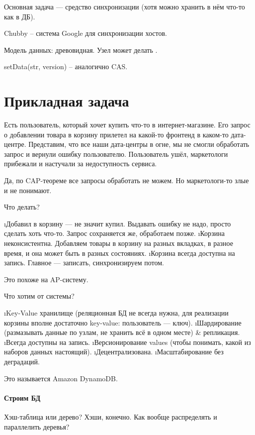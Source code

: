 Основная задача --- средство синхронизации (хотя можно хранить в нём что-то как в ДБ).

Chubby -- система Google для синхронизации хостов. 

Модель данных: древовидная.
Узел может делать .

setData(str, version) -- аналогично CAS.

\section{Прикладная задача}
Есть пользователь, который хочет купить что-то в интернет-магазине. Его запрос о добавлении товара в корзину прилетел на какой-то фронтенд в каком-то дата-центре. Представим, что все наши дата-центры в огне, мы не смогли обработать запрос и вернули ошибку пользователю. Пользователь ушёл, маркетологи прибежали и настучали за недоступность сервиса. 

Да, по CAP-теореме все запросы обработать не можем. Но маркетологи-то злые и не понимают.

Что делать?
\begin{enumerate}
\i Добавил в корзину --- не значит купил. Выдавать ошибку не надо, просто сделать хоть что-то. Запрос сохраняется же, обработаем позже.
\i Корзина неконсистентна. Добавляем товары в корзину на разных вкладках, в разное время, и она может быть в разных состояниях.
\i Корзина всегда доступна на запись. Главное --- записать, синхронизируем потом.
\end{enumerate}
Это похоже на AP-систему.

Что хотим от системы?
\begin{enumerate}
\i Key-Value хранилище (реляционная БД не всегда нужна, для реализации корзины вполне достаточно key-value: пользователь --- ключ).
\i Шардирование (размазывать данные по узлам, не хранить всё в одном месте) \& репликация.
\i Всегда доступны на запись.
\i Версионирование values (чтобы понимать, какой из наборов данных настоящий).
\i Децентрализована.
\i Масштабирование без деградаций.
\end{enumerate}

Это называется Amazon DynamoDB.

\paragraph{Строим БД}

Хэш-таблица или дерево? Хэши, конечно. Как вообще распределять и параллелить деревья?


